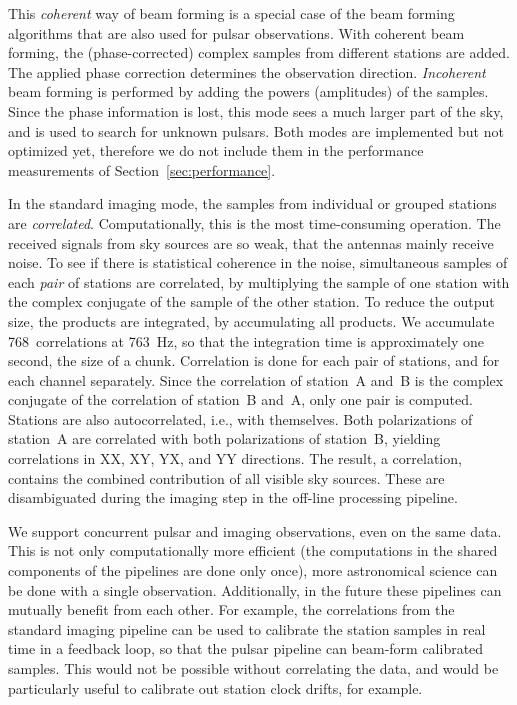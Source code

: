 \documentclass{sig-alternate}
\begin{document}
This \emph{coherent\/} way of beam forming is a special case of the beam
forming algorithms that are also used for pulsar observations.
With coherent beam forming, the (phase-corrected) complex samples from
different stations are added.
The applied phase correction determines the observation direction.
\emph{Incoherent\/} beam forming is performed by adding the powers (amplitudes)
of the samples.
Since the phase information is lost, this mode sees a much larger part of the
sky, and is used to search for unknown pulsars.
Both modes are implemented but not optimized yet, therefore we do not include
them in the performance measurements of Section~\ref{sec:performance}.

In the standard imaging mode, the samples from individual or grouped stations
are \emph{correlated}.
Computationally, this is the most time-consuming operation.
The received signals from sky sources are so weak, that the antennas mainly
receive noise.
To see if there is statistical coherence in the noise, simultaneous samples of
each \emph{pair\/} of stations are correlated, by multiplying the sample of one
station with the complex conjugate of the sample of the other station.
To reduce the output size, the products are integrated, by accumulating all
products.
We accumulate 768~correlations at 763~Hz, so that the integration time is
approximately one second, the size of a chunk.
Correlation is done for each pair of stations, and for each channel separately.
Since the correlation of station~A and~B is the complex conjugate of the
correlation of station~B and~A, only one pair is computed.
Stations are also autocorrelated, i.e., with themselves.
Both polarizations of station~A are correlated with both polarizations of
station~B, yielding correlations in XX, XY, YX, and YY directions.
The result, a correlation, contains the combined contribution of all visible
sky sources.
These are disambiguated during the imaging step in the off-line processing
pipeline.

We support concurrent pulsar and imaging observations, even on the same data.
This is not only computationally more efficient (the computations in the
shared components of the pipelines are done only once), more astronomical
science can be done with a single observation.
Additionally, in the future these pipelines can mutually benefit from each
other.
For example, the correlations from the standard imaging pipeline can be used
to calibrate the station samples in real time in a feedback loop, so that the
pulsar pipeline can beam-form calibrated samples.
This would not be possible without correlating the data, and would be
particularly useful to calibrate out station clock drifts, for example.
\end{document}
